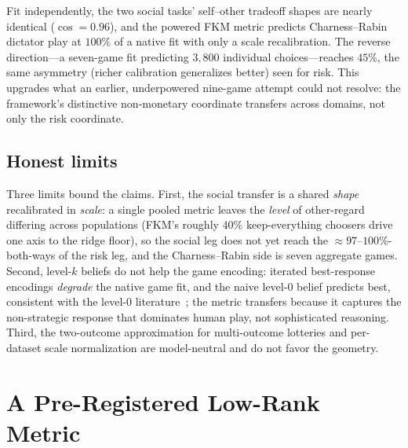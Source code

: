 \documentclass[journal]{IEEEtran}
\begin{document}
Fit independently, the two social tasks' self--other tradeoff shapes are nearly identical ($\cos=0.96$), and the powered FKM metric predicts Charness--Rabin dictator play at $100\%$ of a native fit with only a scale recalibration.
The reverse direction---a seven-game fit predicting $3{,}800$ individual choices---reaches $45\%$, the same asymmetry (richer calibration generalizes better) seen for risk.
This upgrades what an earlier, underpowered nine-game attempt could not resolve: the framework's distinctive non-monetary coordinate transfers across domains, not only the risk coordinate.

\subsection{Honest limits}
Three limits bound the claims.
First, the social transfer is a shared \emph{shape} recalibrated in \emph{scale}: a single pooled metric leaves the \emph{level} of other-regard differing across populations (FKM's roughly $40\%$ keep-everything choosers drive one axis to the ridge floor), so the social leg does not yet reach the $\approx97$--$100\%$-both-ways of the risk leg, and the Charness--Rabin side is seven aggregate games.
Second, level-$k$ beliefs do not help the game encoding: iterated best-response encodings \emph{degrade} the native game fit, and the naive level-$0$ belief predicts best, consistent with the level-$0$ literature~\cite{wright2017}; the metric transfers because it captures the non-strategic response that dominates human play, not sophisticated reasoning.
Third, the two-outcome approximation for multi-outcome lotteries and per-dataset scale normalization are model-neutral and do not favor the geometry.

\section{A Pre-Registered Low-Rank Metric}
\label{sec:lowrank}
\end{document}
